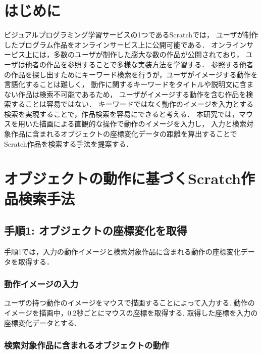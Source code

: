 \documentclass[twocolumn]{jarticle} %
\begin{document}
\maketitle
\thispagestyle{empty} %



\section{はじめに}
ビジュアルプログラミング学習サービスの1つであるScratchでは，
ユーザが制作したプログラム作品をオンラインサービス上に公開可能である．
オンラインサービス上には，多数のユーザが制作した膨大な数の作品が公開されており，
ユーザは他者の作品を参照することで多様な実装方法を学習する\cite{spfa}．
参照する他者の作品を探し出すためにキーワード検索を行うが，ユーザがイメージする動作を言語化することは難しく，
動作に関するキーワードをタイトルや説明文に含まない作品は検索不可能であるため，
ユーザがイメージする動作を含む作品を検索することは容易ではない\cite{wild}．
キーワードではなく動作のイメージを入力とする検索を実現することで，作品検索を容易にできると考える．
本研究では，マウスを用いた描画による直観的な操作で動作のイメージを入力し，
入力と検索対象作品に含まれるオブジェクトの座標変化データの距離を算出することで
Scratch作品を検索する手法を提案する．

\section{オブジェクトの動作に基づくScratch作品検索手法}
\subsection{手順1: オブジェクトの座標変化を取得}
手順1では，入力の動作イメージと検索対象作品に含まれる動作の座標変化データを取得する．
\subsubsection{動作イメージの入力}
ユーザの持つ動作のイメージをマウスで描画することによって入力する.
動作のイメージを描画中，0.2秒ごとにマウスの座標を取得する.
取得した座標を入力の座標変化データとする.

\subsubsection{検索対象作品に含まれるオブジェクトの動作}
\end{document}
